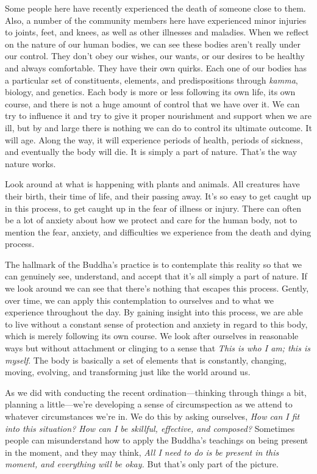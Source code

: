 Some people here have recently experienced the death of someone close 
to them. Also, a number of the community members here have experienced 
minor injuries to joints, feet, and knees, as well as other illnesses 
and maladies. When we reflect on the nature of our human bodies, we can 
see these bodies aren't really under our control. They don't obey our 
wishes, our wants, or our desires to be healthy and always comfortable. 
They have their own quirks. Each one of our bodies has a particular set 
of constituents, elements, and predispositions through \emph{kamma}, 
biology, and genetics. Each body is more or less following its own 
life, its own course, and there is not a huge amount of control that we 
have over it. We can try to influence it and try to give it proper 
nourishment and support when we are ill, but by and large there is 
nothing we can do to control its ultimate outcome. It will age. Along 
the way, it will experience periods of health, periods of sickness, and 
eventually the body will die. It is simply a part of nature. That's the 
way nature works.

Look around at what is happening with plants and animals. All creatures 
have their birth, their time of life, and their passing away. It's so 
easy to get caught up in this process, to get caught up in the fear of 
illness or injury. There can often be a lot of anxiety about how we 
protect and care for the human body, not to mention the fear, anxiety, 
and difficulties we experience from the death and dying process.

The hallmark of the Buddha's practice is to contemplate this reality so 
that we can genuinely see, understand, and accept that it's all simply 
a part of nature. If we look around we can see that there's nothing 
that escapes this process. Gently, over time, we can apply this 
contemplation to ourselves and to what we experience throughout the 
day. By gaining insight into this process, we are able to live without 
a constant sense of protection and anxiety in regard to this body, 
which is merely following its own course. We look after ourselves in 
reasonable ways but without attachment or clinging to a sense that 
\emph{This is who I am; this is myself}. The body is basically a set of 
elements that is constantly, changing, moving, evolving, and 
transforming just like the world around us.


As we did with conducting the recent ordination---thinking through 
things a bit, planning a little---we're developing a sense of 
circumspection as we attend to whatever circumstances we're in. We do 
this by asking ourselves, \emph{How can I fit into this situation? How 
can I be skillful, effective, and composed?} Sometimes people can 
misunderstand how to apply the Buddha's teachings on being present in 
the moment, and they may think, \emph{All I need to do is be present in 
this moment, and everything will be okay.} But that's only part of the 
picture.


